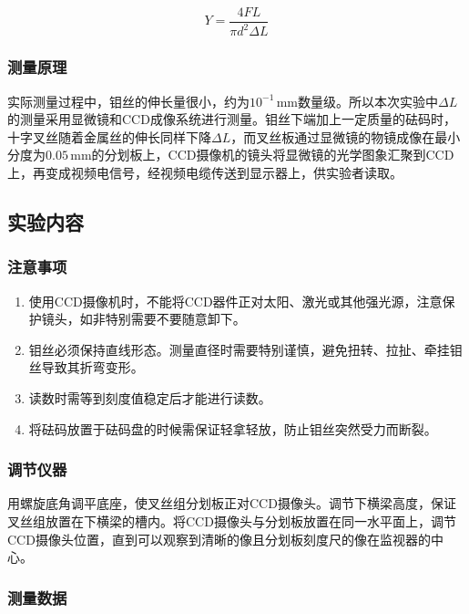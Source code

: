 \documentclass[UTF8]{article}
\theoremstyle{MyLineTheoremStyle} %
\theoremstyle{MyBlockTheoremStyle} %
\theoremstyle{MySubsubsectionStyle} %
\begin{document}
\begin{equation}
    Y=\frac{4FL}{\pi d^2\Delta L}
\end{equation}

\subsubsection{测量原理}

实际测量过程中，钼丝的伸长量很小，约为$ 10^{-1}\,\mathrm{mm} $数量级。所以本次实验中$ \Delta L $的测量采用显微镜和CCD成像系统进行测量。钼丝下端加上一定质量的砝码时，十字叉丝随着金属丝的伸长同样下降$ \Delta L $，而叉丝板通过显微镜的物镜成像在最小分度为$ 0.05\,\mathrm{mm} $的分划板上，CCD摄像机的镜头将显微镜的光学图象汇聚到CCD上，再变成视频电信号，经视频电缆传送到显示器上，供实验者读取。

\subsection{实验内容}

\subsubsection{注意事项}

\begin{enumerate}
    \item 使用CCD摄像机时，不能将CCD器件正对太阳、激光或其他强光源，注意保护镜头，如非特别需要不要随意卸下。
    \item 钼丝必须保持直线形态。测量直径时需要特别谨慎，避免扭转、拉扯、牵挂钼丝导致其折弯变形。
    \item 读数时需等到刻度值稳定后才能进行读数。
    \item 将砝码放置于砝码盘的时候需保证轻拿轻放，防止钼丝突然受力而断裂。
\end{enumerate}

\subsubsection{调节仪器}
用螺旋底角调平底座，使叉丝组分划板正对CCD摄像头。调节下横梁高度，保证叉丝组放置在下横梁的槽内。将CCD摄像头与分划板放置在同一水平面上，调节CCD摄像头位置，直到可以观察到清晰的像且分划板刻度尺的像在监视器的中心。

\subsubsection{测量数据}
\end{document}
